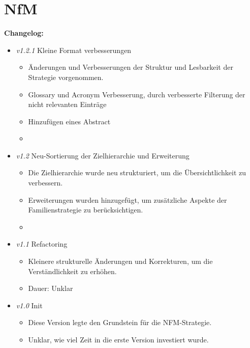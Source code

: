 \chapter{NfM}
\setcounter{section}{0}



\textbf{Changelog:} \\
\begin{itemize}
	\item \textit{v1.2.1} Kleine Format verbesserungen
	\begin{itemize}
		\item Änderungen und Verbesserungen der Struktur und Lesbarkeit der Strategie vorgenommen.
		\item Glossary und Acronym Verbesserung, durch verbesserte Filterung der nicht relevanten Einträge
		\item Hinzufügen eines Abstract
		\item {}
	\end{itemize}
	
	\item \textit{v1.2} Neu-Sortierung der Zielhierarchie und Erweiterung
	\begin{itemize}
		\item Die Zielhierarchie wurde neu strukturiert, um die Übersichtlichkeit zu verbessern.
		\item Erweiterungen wurden hinzugefügt, um zusätzliche Aspekte der Familienstrategie zu berücksichtigen.
		\item {}
	\end{itemize}
	
	\item \textit{v1.1} Refactoring
	\begin{itemize}
		\item Kleinere strukturelle Änderungen und Korrekturen, um die Verständlichkeit zu erhöhen.
		\item Dauer: Unklar
	\end{itemize}
	
	\item \textit{v1.0} Init
	\begin{itemize}
		\item Diese Version legte den Grundstein für die NFM-Strategie. 
		\item Unklar, wie viel Zeit in die erste Version investiert wurde.
	\end{itemize}
\end{itemize}
\pagebreak

